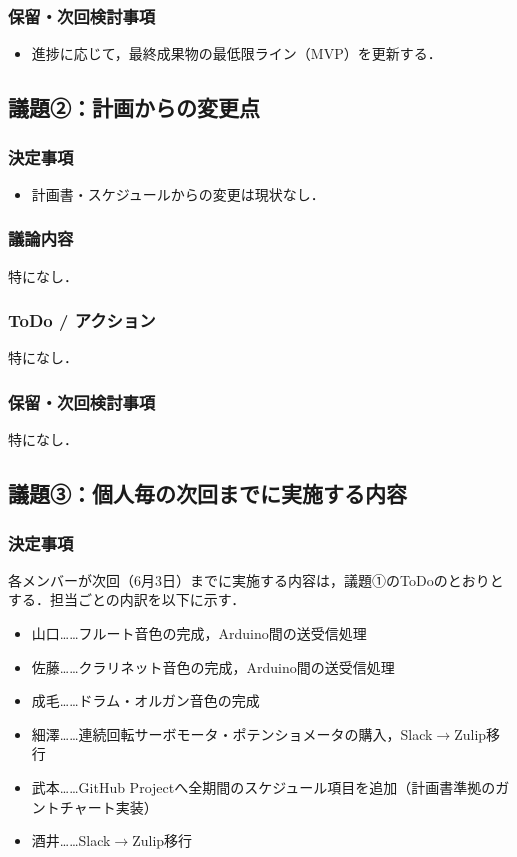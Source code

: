 \documentclass[a4paper,12pt]{ltjsarticle}
\begin{document}
\subsubsection*{保留・次回検討事項}
\begin{itemize}[leftmargin=1.5em]
  \item 進捗に応じて，最終成果物の最低限ライン（MVP）を更新する．
\end{itemize}

\subsection*{議題②：計画からの変更点}

\subsubsection*{決定事項}
\begin{itemize}[leftmargin=1.5em]
  \item 計画書・スケジュールからの変更は現状なし．
\end{itemize}

\subsubsection*{議論内容}
特になし．

\subsubsection*{ToDo / アクション}
特になし．

\subsubsection*{保留・次回検討事項}
特になし．

\subsection*{議題③：個人毎の次回までに実施する内容}

\subsubsection*{決定事項}
各メンバーが次回（6月3日）までに実施する内容は，議題①のToDoのとおりとする．担当ごとの内訳を以下に示す．
\begin{itemize}[leftmargin=1.5em]
  \item 山口……フルート音色の完成，Arduino間の送受信処理
  \item 佐藤……クラリネット音色の完成，Arduino間の送受信処理
  \item 成毛……ドラム・オルガン音色の完成
  \item 細澤……連続回転サーボモータ・ポテンショメータの購入，Slack$\to$Zulip移行
  \item 武本……GitHub Projectへ全期間のスケジュール項目を追加（計画書準拠のガントチャート実装）
  \item 酒井……Slack$\to$Zulip移行
\end{itemize}
\end{document}
